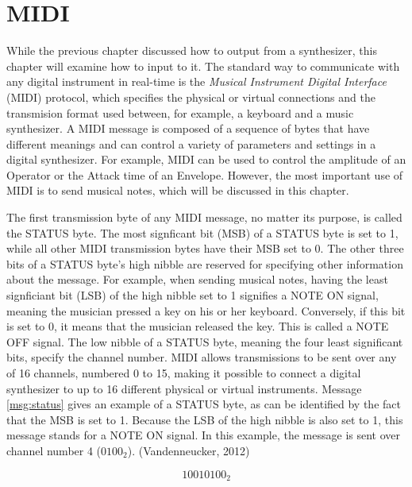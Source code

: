 \chapter{MIDI}

While the previous chapter discussed how to output from a synthesizer, this chapter will examine how to input to it. The standard way to communicate with any digital instrument in real-time is the \emph{Musical Instrument Digital Interface} (MIDI) protocol, which specifies the physical or virtual connections and the transmision format used between, for example, a keyboard and a music synthesizer. A MIDI message is composed of a sequence of bytes that have different meanings and can control a variety of parameters and settings in a digital synthesizer. For example, MIDI can be used to control the amplitude of an Operator or the Attack time of an Envelope. However, the most important use of MIDI is to send musical notes, which will be discussed in this chapter. \vspace{\baselineskip}

The first transmission byte of any MIDI message, no matter its purpose, is called the STATUS byte. The most signficant bit (MSB\footnotemark[1]{}) of a STATUS byte is set to 1, while all other MIDI transmission bytes have their MSB set to 0. The other three bits of a STATUS byte's high nibble\footnotemark[2]{} are reserved for specifying other information about the message. For example, when sending musical notes, having the least signficiant bit (LSB) of the high nibble set to 1 signifies a NOTE ON signal, meaning the musician pressed a key on his or her keyboard. Conversely, if this bit is set to 0, it means that the musician released the key. This is called a NOTE OFF signal. The low nibble of a STATUS byte, meaning the four least significant bits, specify the channel number. MIDI allows transmissions to be sent over any of 16 channels, numbered 0 to 15, making it possible to connect a digital synthesizer to up to 16 different physical or virtual instruments. Message \ref{msg:status} gives an example of a STATUS byte, as can be identified by the fact that the MSB is set to 1. Because the LSB of the high nibble is also set to 1, this message stands for a NOTE ON signal. In this example, the message is sent over channel number 4 (${0100}_{2}$). (Vandenneucker, 2012)

\begin{equation}
  {10010100}_{2}
  \label{msg:status}
\end{equation}

